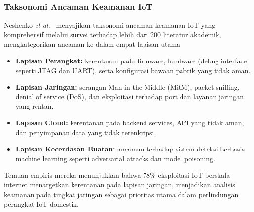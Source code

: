 \subsubsection{Taksonomi Ancaman Keamanan IoT}
Neshenko \textit{et al.}~\cite{b8} menyajikan taksonomi ancaman keamanan IoT
yang komprehensif melalui survei terhadap lebih dari 200 literatur akademik,
mengkategorikan ancaman ke dalam empat lapisan utama:
\begin{itemize}
    \item \textbf{Lapisan Perangkat:} kerentanan pada firmware, hardware
    (debug interface seperti JTAG dan UART), serta konfigurasi bawaan pabrik
    yang tidak aman.
    \item \textbf{Lapisan Jaringan:} serangan Man-in-the-Middle (MitM), packet
    sniffing, denial of service (DoS), dan eksploitasi terhadap port dan
    layanan jaringan yang rentan.
    \item \textbf{Lapisan Cloud:} kerentanan pada backend services, API yang
    tidak aman, dan penyimpanan data yang tidak terenkripsi.
    \item \textbf{Lapisan Kecerdasan Buatan:} ancaman terhadap sistem deteksi
    berbasis machine learning seperti adversarial attacks dan model poisoning.
\end{itemize}
Temuan empiris mereka menunjukkan bahwa 78\% eksploitasi IoT berskala internet
menargetkan kerentanan pada lapisan jaringan, menjadikan analisis keamanan pada
tingkat jaringan sebagai prioritas utama dalam perlindungan perangkat IoT
domestik.

